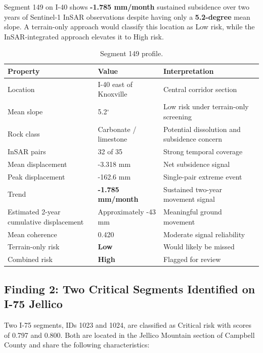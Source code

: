 \documentclass[11pt,letterpaper]{article}
\begin{document}
\begin{boxednote}
Segment 149 on I-40 shows \textbf{-1.785 mm/month} sustained subsidence over two years of Sentinel-1 InSAR observations despite having only a \textbf{5.2-degree} mean slope. A terrain-only approach would classify this location as Low risk, while the InSAR-integrated approach elevates it to High risk.
\end{boxednote}

\begin{table}[H]
\centering
\caption{Segment 149 profile.}
\label{tab:seg149}
\begin{tabularx}{\linewidth}{L{4cm}L{4cm}Y}
\toprule
\textbf{Property} &
\textbf{Value} &
\textbf{Interpretation} \\
\midrule
Location & I-40 east of Knoxville & Central corridor section \\
Mean slope & 5.2$^\circ$ & Low risk under terrain-only screening \\
Rock class & Carbonate / limestone & Potential dissolution and subsidence concern \\
InSAR pairs & 32 of 35 & Strong temporal coverage \\
Mean displacement & -3.318 mm & Net subsidence signal \\
Peak displacement & -162.6 mm & Single-pair extreme event \\
Trend & \textbf{-1.785 mm/month} & Sustained two-year movement signal \\
Estimated 2-year cumulative displacement & Approximately -43 mm & Meaningful ground movement \\
Mean coherence & 0.420 & Moderate signal reliability \\
Terrain-only risk & \textbf{Low} & Would likely be missed \\
Combined risk & \textbf{High} & Flagged for review \\
\bottomrule
\end{tabularx}
\end{table}

\subsection{Finding 2: Two Critical Segments Identified on I-75 Jellico}

Two I-75 segments, IDs 1023 and 1024, are classified as Critical risk with scores of 0.797 and 0.800. Both are located in the Jellico Mountain section of Campbell County and share the following characteristics:
\end{document}
